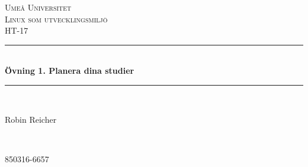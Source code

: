 \begin{titlepage} %
	\newcommand{\HRule}{\rule{\linewidth}{0.5mm}} %
	
	\center %
	
	
	\textsc{\LARGE Umeå Universitet}\\[1.5cm] %
	
	\textsc{\Large Linux som utvecklingsmiljö}\\[0.5cm] %
	
	\textsc{\large HT-17}\\[0.5cm] %
	
	
	\HRule\\[0.4cm]
	
	{\huge\bfseries Övning 1. Planera dina studier}\\[0.4cm] %
	
	\HRule\\[1.5cm]
	
	
	\begin{minipage}{0.4\textwidth}
		\begin{flushleft}
			\large
			Robin Reicher
		\end{flushleft}
	\end{minipage}
	~
	\begin{minipage}{0.4\textwidth}
		\begin{flushright}
			\large
			850316-6657
		\end{flushright}
	\end{minipage}
	
	
	

\end{titlepage}
